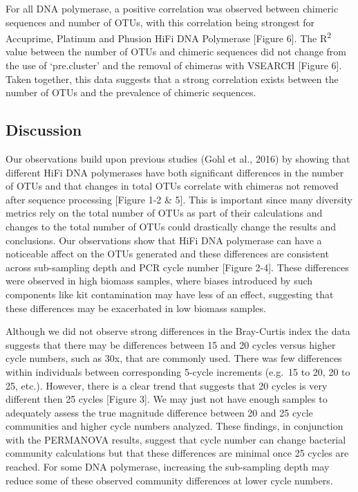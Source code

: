 \documentclass[12pt,]{article}
\begin{document}
For all DNA polymerase, a positive correlation was observed between
chimeric sequences and number of OTUs, with this correlation being
strongest for Accuprime, Platinum and Phusion HiFi DNA Polymerase
{[}Figure 6{]}. The R\textsuperscript{2} value between the number of
OTUs and chimeric sequences did not change from the use of `pre.cluster'
and the removal of chimeras with VSEARCH {[}Figure 6{]}. Taken together,
this data suggests that a strong correlation exists between the number
of OTUs and the prevalence of chimeric sequences.

\newpage

\subsection{Discussion}\label{discussion}

Our observations build upon previous studies (Gohl et al., 2016) by
showing that different HiFi DNA polymerases have both significant
differences in the number of OTUs and that changes in total OTUs
correlate with chimeras not removed after sequence processing {[}Figure
1-2 \& 5{]}. This is important since many diversity metrics rely on the
total number of OTUs as part of their calculations and changes to the
total number of OTUs could drastically change the results and
conclusions. Our observations show that HiFi DNA polymerase can have a
noticeable affect on the OTUs generated and these differences are
consistent across sub-sampling depth and PCR cycle number {[}Figure
2-4{]}. These differences were observed in high biomass samples, where
biases introduced by such components like kit contamination may have
less of an effect, suggesting that these differences may be exacerbated
in low biomass samples.

Although we did not observe strong differences in the Bray-Curtis index
the data suggests that there may be differences between 15 and 20 cycles
versus higher cycle numbers, such as 30x, that are commonly used. There
was few differences within individuals between corresponding 5-cycle
increments (e.g.~15 to 20, 20 to 25, etc.). However, there is a clear
trend that suggests that 20 cycles is very different then 25 cycles
{[}Figure 3{]}. We may just not have enough samples to adequately assess
the true magnitude difference between 20 and 25 cycle communities and
higher cycle numbers analyzed. These findings, in conjunction with the
PERMANOVA results, suggest that cycle number can change bacterial
community calculations but that these differences are minimal once 25
cycles are reached. For some DNA polymerase, increasing the sub-sampling
depth may reduce some of these observed community differences at lower
cycle numbers.
\end{document}
